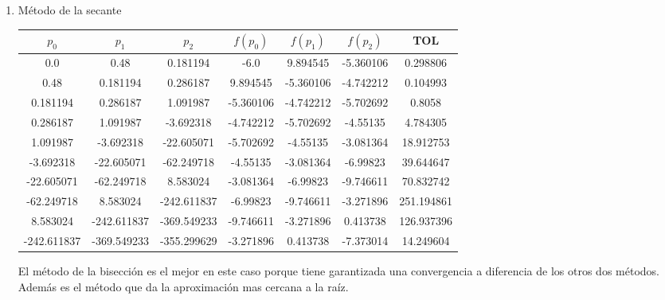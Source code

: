 \documentclass[12pt]{article}
\begin{document}
\begin{enumerate}
\begin{enumerate}
        \item Método de la secante
            \begin{center}
            \begin{tabular}{|c|c|c|c|c|c|c|}
            \hline
            \(p_0\) & \(p_1\)& \(p_2\)&\(f(p_0)\) & \(f(p_1)\) & \(f(p_2)\)&\textbf{TOL} \\
            \hline
            0.0 & 0.48 & 0.181194 & -6.0 & 9.894545 & -5.360106 & 0.298806 \\
            0.48 & 0.181194 & 0.286187 & 9.894545 & -5.360106 & -4.742212 & 0.104993 \\
            0.181194 & 0.286187 & 1.091987 & -5.360106 & -4.742212 & -5.702692 & 0.8058 \\
            0.286187 & 1.091987 & -3.692318 & -4.742212 & -5.702692 & -4.55135 & 4.784305 \\
            1.091987 & -3.692318 & -22.605071 & -5.702692 & -4.55135 & -3.081364 & 18.912753 \\
            -3.692318 & -22.605071 & -62.249718 & -4.55135 & -3.081364 & -6.99823 & 39.644647 \\
            -22.605071 & -62.249718 & 8.583024 & -3.081364 & -6.99823 & -9.746611 & 70.832742 \\
            -62.249718 & 8.583024 & -242.611837 & -6.99823 & -9.746611 & -3.271896 & 251.194861 \\
            8.583024 & -242.611837 & -369.549233 & -9.746611 & -3.271896 & 0.413738 & 126.937396 \\
            -242.611837 & -369.549233 & -355.299629 & -3.271896 & 0.413738 & -7.373014 & 14.249604 \\
            \hline 
            \end{tabular}
            \end{center}

        El método de la bisección es el mejor en este caso porque tiene garantizada una convergencia a diferencia de los otros dos métodos.
        Además es el método que da la aproximación mas cercana a la raíz.
    \end{enumerate}


\end{enumerate}
\end{document}
